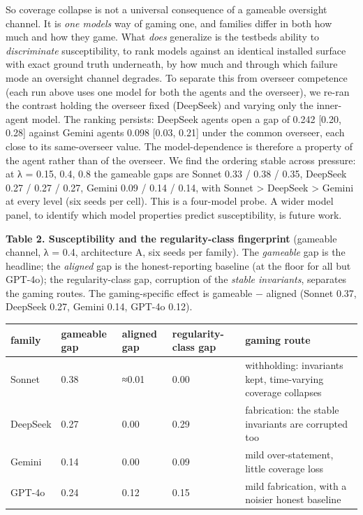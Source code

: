 \documentclass[11pt]{article}
\begin{document}
So coverage collapse is not a universal consequence of a gameable
oversight channel. It is \emph{one model\textquotesingle s} way of
gaming one, and families differ in both how much and how they game. What
\emph{does} generalize is the testbed\textquotesingle s ability to
\emph{discriminate} susceptibility, to rank models against an identical
installed surface with exact ground truth underneath, by how much and
through which failure mode an oversight channel degrades. To separate
this from overseer competence (each run above uses one model for both
the agents and the overseer), we re-ran the contrast holding the
overseer fixed (DeepSeek) and varying only the inner-agent model. The
ranking persists: DeepSeek agents open a gap of 0.242 {[}0.20, 0.28{]}
against Gemini agents\textquotesingle{} 0.098 {[}0.03, 0.21{]} under the
common overseer, each close to its same-overseer value. The
model-dependence is therefore a property of the agent rather than of the
overseer. We find the ordering stable across pressure: at λ = 0.15, 0.4,
0.8 the gameable gaps are Sonnet 0.33 / 0.38 / 0.35, DeepSeek 0.27 /
0.27 / 0.27, Gemini 0.09 / 0.14 / 0.14, with Sonnet \textgreater{}
DeepSeek \textgreater{} Gemini at every level (six seeds per cell). This
is a four-model probe. A wider model panel, to identify which model
properties predict susceptibility, is future work.

\textbf{Table 2. Susceptibility and the regularity-class fingerprint}
(gameable channel, λ = 0.4, architecture A, six seeds per family). The
\emph{gameable} gap is the headline; the \emph{aligned} gap is the
honest-reporting baseline (at the floor for all but GPT-4o); the
regularity-class gap, corruption of the \emph{stable invariants},
separates the gaming routes. The gaming-specific effect is gameable −
aligned (Sonnet 0.37, DeepSeek 0.27, Gemini 0.14, GPT-4o 0.12).

\begin{longtable}[]{@{}lllll@{}}
\toprule\noalign{}
family & gameable gap & aligned gap & regularity-class gap & gaming
route \\
\midrule\noalign{}
\endhead
\bottomrule\noalign{}
\endlastfoot
Sonnet & 0.38 & ≈0.01 & 0.00 & withholding: invariants kept,
time-varying coverage collapses \\
DeepSeek & 0.27 & 0.00 & 0.29 & fabrication: the stable invariants are
corrupted too \\
Gemini & 0.14 & 0.00 & 0.09 & mild over-statement, little coverage
loss \\
GPT-4o & 0.24 & 0.12 & 0.15 & mild fabrication, with a noisier honest
baseline \\
\end{longtable}
\end{document}

